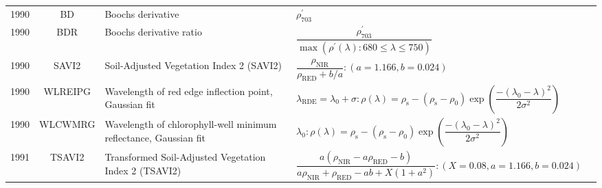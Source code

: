 \documentclass[10pt]{article}
\begin{document}
\begin{ThreePartTable}
\begin{longtable}{c c m{2.80in} M{2.80in} M{1.5in}}
  1990 & BD      & Boochs derivative                                                              & $\rho^\prime_{703}$                                                                                                                                                                                                                                                                     & \citet{Boochs1990}                                  \\
  1990 & BDR     & Boochs derivative ratio                                                        & $\dfrac{\rho^\prime_{703}}{\max(\rho^\prime(\lambda):680\le\lambda\le750)}$                                                                                                                                                                                                             & \citet{Boochs1990}                                  \\
  1990 & SAVI2   & Soil-Adjusted Vegetation Index 2 (SAVI2)                                       & $\dfrac{\rho_\text{NIR}}{\rho_\text{RED}+b/a}:(a=1.166,b=0.024)$                                                                                                                                                                                                                        & \citet{Major1990,Huete1984}                         \\
  1990 & WLREIPG & Wavelength of red edge inflection point, Gaussian fit                          & $\lambda_\text{RDE} = \lambda_0+\sigma : \rho(\lambda) = \rho_\text{s}-(\rho_\text{s}-\rho_0)\exp\left(\dfrac{-(\lambda_0-\lambda)^2}{2\sigma^2}\right)$                                                                                                                                & \citet{Miller1990}                                  \\
  1990 & WLCWMRG & Wavelength of chlorophyll-well minimum reflectance, Gaussian fit               & $\lambda_0 : \rho(\lambda) = \rho_\text{s}-(\rho_\text{s}-\rho_0)\exp\left(\dfrac{-(\lambda_0-\lambda)^2}{2\sigma^2}\right)$                                                                                                                                                            & \citet{Miller1990}                                  \\
  1991 & TSAVI2  & Transformed Soil-Adjusted Vegetation Index 2 (TSAVI2)                          & $\dfrac{a(\rho_\text{NIR}-a\rho_\text{RED}-b)}{a\rho_\text{NIR}+\rho_\text{RED}-ab+X(1+a^2)}:(X=0.08,a=1.166,b=0.024)$                                                                                                                                                                  & \citet{Baret1991,Huete1984}                         \\

\end{longtable}
\end{ThreePartTable}
\end{document}
